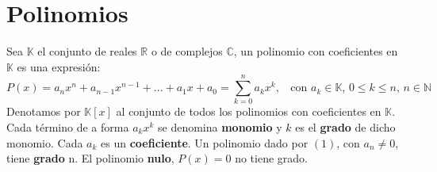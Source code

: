 \documentclass[11pt,a4paper]{article}
\begin{document}
\section{Polinomios}
\noindent Sea $\mathbb{K}$ el conjunto de reales $\mathbb{R}$ o de complejos $\mathbb{C}$, un polinomio con coeficientes en $\mathbb{K}$ es una expresi\'on: 
\begin{equation}
P(x)=a_nx^n + a_{n-1}x^{n-1}+...+a_1x+a_0 = \sum_{k=0}^n a_kx^k,\ \ \ \ \text{con $a_k \in \mathbb{K}$, $0\leq k \leq n$, $n\in\mathbb{N}$}
\end{equation}
Denotamos por $\mathbb{K}[x]$ al conjunto de todos los polinomios con coeficientes en $\mathbb{K}$. Cada t\'ermino de a forma $a_kx^k$ se denomina \textbf{monomio} y $k$ es el \textbf{grado} de dicho monomio. Cada $a_k$ es un \textbf{coeficiente}. Un polinomio dado por $(1)$, con $a_n \not = 0$, tiene \textbf{grado} n. El polinomio \textbf{nulo}, $P(x)=0$ no tiene grado.\\
\end{document}
